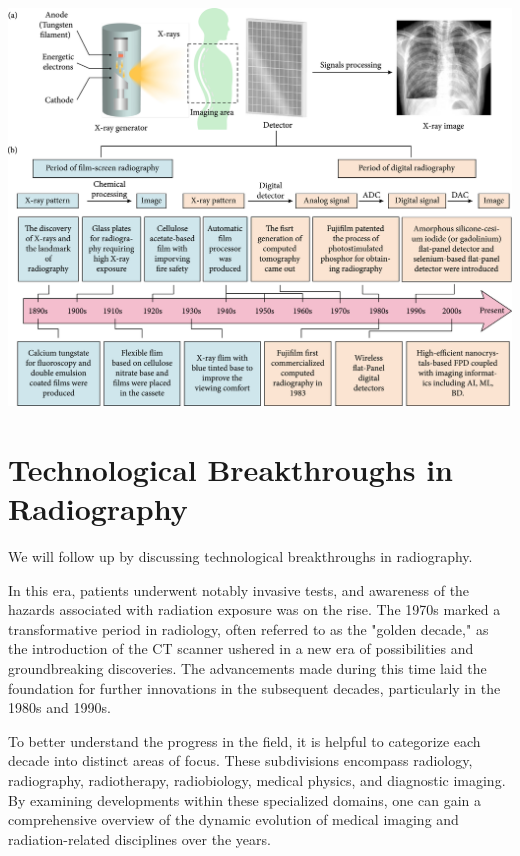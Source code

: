 \documentclass[a4paper,12pt]{report}
\begin{document}
\begin{center}
  \includegraphics[scale = 0.5]{chrono.jpg}
  \label{chrono}
\end{center}

\section{	Technological Breakthroughs in Radiography}

We will follow up by discussing technological breakthroughs in radiography. 

In this era, patients underwent notably invasive tests, and awareness of the hazards
associated with radiation exposure was on the rise. The 1970s marked a transformative
period in radiology, often referred to as the "golden decade," as the introduction of the CT
scanner ushered in a new era of possibilities and groundbreaking discoveries. The
advancements made during this time laid the foundation for further innovations in the
subsequent decades, particularly in the 1980s and 1990s.

To better understand the progress in the field, it is helpful to categorize each decade into
distinct areas of focus. These subdivisions encompass radiology, radiography,
radiotherapy, radiobiology, medical physics, and diagnostic imaging. By examining
developments within these specialized domains, one can gain a comprehensive overview
of the dynamic evolution of medical imaging and radiation-related disciplines over the
years.
\end{document}
